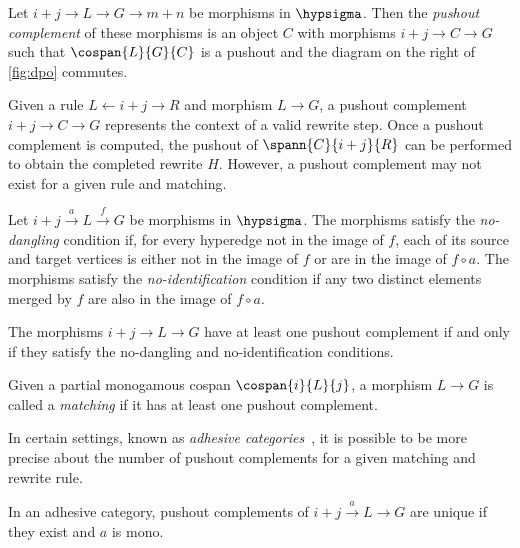 \begin{definition}\label{def:pushout-complement}
    Let \(i + j \to L \to G \rightarrow m + n\) be morphisms in \(\hypsigma\).
    Then the \emph{pushout complement} of these morphisms is an object \(C\)
    with morphisms \(i + j \to C \to G\) such that \(\cospan{L}{G}{C}\) is a
    pushout and the diagram on the right of \cref{fig:dpo} commutes.
\end{definition}

Given a rule \(L \leftarrow i+j \to R\) and morphism \(L \to G\), a pushout
complement \(i+j \to C \to G\) represents the context of a valid rewrite step.
Once a pushout complement is computed, the pushout of
\(\spann{C}{i+j}{R}\) can be performed to obtain the completed rewrite \(H\).
However, a pushout complement may not exist for a given rule and matching.

\begin{definition}
    Let \(i + j \xrightarrow{a} L \xrightarrow{f} G\) be morphisms in
    \(\hypsigma\).
    The morphisms satisfy the \emph{no-dangling} condition if, for every
    hyperedge not in the image of \(f\), each of its source and target vertices
    is either not in the image of \(f\) or are in the image of \(f \circ a\).
    The morphisms satisfy the \emph{no-identification} condition if any two
    distinct elements merged by \(f\) are also in the image of \(f \circ a\).
\end{definition}

\begin{proposition}
    \label{prop:pushout-complement}
    The morphisms \(i + j \to L \to G\) have at least one pushout complement if
    and only if they satisfy the no-dangling and no-identification conditions.
\end{proposition}

\begin{definition}
    Given a partial monogamous cospan \(\cospan{i}{L}{j}\), a morphism
    \(L \to G\) is called a \emph{matching} if it has at least one pushout
    complement.
\end{definition}

In certain settings, known as
\emph{adhesive categories}~\cite{lack2004adhesive}, it is possible to be more
precise about the number of pushout complements for a given matching and rewrite
rule.

\begin{proposition}
    In an adhesive category, pushout complements of \(
        i + j \xrightarrow{a} L \to G\)
    are unique if they exist and \(a\) is mono.
\end{proposition}

